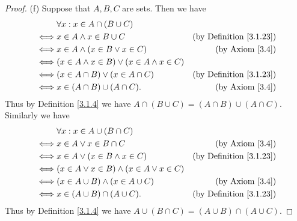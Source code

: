 \begin{proof}{(f)}
    Suppose that \(A, B, C\) are sets.
    Then we have
    \begin{align*}
             & \forall x : x \in A \cap (B \cup C)                                                        \\
        \iff & x \in A \land x \in B \cup C                         & \text{(by Definition \ref{3.1.23})} \\
        \iff & x \in A \land (x \in B \lor x \in C)                 & \text{(by Axiom \ref{3.4})}         \\
        \iff & (x \in A \land x \in B) \lor (x \in A \land x \in C)                                       \\
        \iff & (x \in A \cap B) \lor (x \in A \cap C)               & \text{(by Definition \ref{3.1.23})} \\
        \iff & x \in (A \cap B) \cup (A \cap C).                    & \text{(by Axiom \ref{3.4})}
    \end{align*}
    Thus by Definition \ref{3.1.4} we have \(A \cap (B \cup C) = (A \cap B) \cup (A \cap C)\).
    Similarly we have
    \begin{align*}
             & \forall x : x \in A \cup (B \cap C)                                                       \\
        \iff & x \in A \lor x \in B \cap C                         & \text{(by Axiom \ref{3.4})}         \\
        \iff & x \in A \lor (x \in B \land x \in C)                & \text{(by Definition \ref{3.1.23})} \\
        \iff & (x \in A \lor x \in B) \land (x \in A \lor x \in C)                                       \\
        \iff & (x \in A \cup B) \land (x \in A \cup C)             & \text{(by Axiom \ref{3.4})}         \\
        \iff & x \in (A \cup B) \cap (A \cup C).                   & \text{(by Definition \ref{3.1.23})}
    \end{align*}
    Thus by Definition \ref{3.1.4} we have \(A \cup (B \cap C) = (A \cup B) \cap (A \cup C)\).
\end{proof}

